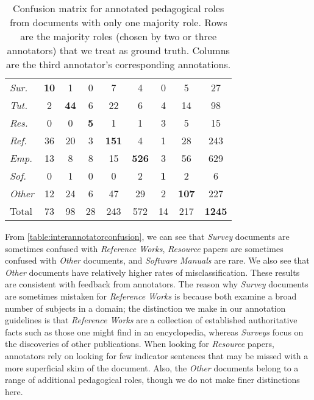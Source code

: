 \documentclass[11pt,a4paper]{article}
\begin{document}
\begin{table}[th]
\centering
\footnotesize
\def\arraystretch{1.4}
\begin{tabular}{@{}l|SSSS[table-format=3]S[table-format=3]SS[table-format=3]|S[table-format=4]@{}}
\hline
&
{} &
{} &
{} &
{} &
{} &
{} &
{} &
{} \\
\hline
\textit{Sur.} & \bfseries 10 & 1 & 0 & 7 & 4 & 0 & 5 & 27 \\
\textit{Tut.} & 2 & \bfseries 44 & 6 & 22 & 6 & 4 & 14 & 98  \\
\textit{Res.} & 0 & 0 & \bfseries 5 & 1 & 1 & 3 & 5 & 15 \\
\textit{Ref.} & 36 & 20 & 3 & \bfseries 151 & 4 & 1 & 28 & 243 \\
\textit{Emp.} & 13 & 8 & 8 & 15 & \bfseries 526 & 3 & 56 & 629 \\
\textit{Sof.} & 0 & 1 & 0 & 0 & 2 & \bfseries 1 & 2 & 6 \\
\textit{Other} & 12 & 24 & 6 & 47 & 29 & 2 & \bfseries 107 & 227 \\
\hline
Total & 73 & 98 & 28 & 243 & 572 & 14 & 217 & \bfseries 1245 \\
\hline
\end{tabular}
\caption{Confusion matrix for annotated pedagogical roles from documents with only one majority role. Rows are the majority roles (chosen by two or three annotators) that we treat as ground truth. Columns are the third annotator's corresponding annotations.}
\label{table:interannotatorconfusion}
\end{table}

From \autoref{table:interannotatorconfusion}, we can see that \textit{Survey} documents are sometimes confused with \textit{Reference Works}, \textit{Resource} papers are sometimes confused with \textit{Other} documents, and \textit{Software Manuals} are rare. We also see that \textit{Other} documents have relatively higher rates of misclassification. These results are consistent with feedback from annotators. The reason why \textit{Survey} documents are sometimes mistaken for \textit{Reference Works} is because both examine a broad number of subjects in a domain; the distinction we make in our annotation guidelines is that \textit{Reference Works} are a collection of established authoritative facts such as those one might find in an encyclopedia, whereas \textit{Surveys} focus on the discoveries of other publications. When looking for \textit{Resource} papers, annotators rely on looking for few indicator sentences that may be missed with a more superficial skim of the document. Also, the \textit{Other} documents belong to a range of additional pedagogical roles, though we do not make finer distinctions here.
\end{document}
